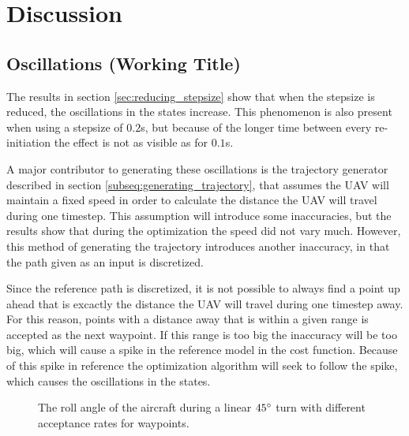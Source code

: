 \chapter{Discussion}


\section{Oscillations (Working Title)}

The results in section \ref{sec:reducing_stepsize} show that when the stepsize is reduced, the oscillations in the states increase. This phenomenon is also present when using a stepsize of $0.2$s, but because of the longer time between every re-initiation the effect is not as visible as for $0.1$s.

A major contributor to generating these oscillations is the trajectory generator described in section \ref{subseq:generating_trajectory}, that assumes the UAV will maintain a fixed speed in order to calculate the distance the UAV will travel during one timestep. This assumption will introduce some inaccuracies, but the results show that during the optimization the speed did not vary much. However, this method of generating the trajectory introduces another inaccuracy, in that the path given as an input is discretized.

Since the reference path is discretized, it is not possible to always find a point up ahead that is excactly the distance the UAV will travel during one timestep away. For this reason, points with a distance away that is within a given range is accepted as the next waypoint. If this range is too big the inaccuracy will be too big, which will cause a spike in the reference model in the cost function. Because of this spike in reference the optimization algorithm will seek to follow the spike, which causes the oscillations in the states.

\begin{figure}[]
	\centering
	\caption{The roll angle of the aircraft during a linear $45\degree$ turn with different acceptance rates for waypoints.}
	\label{fig:oscillating_attitude}
\end{figure}

